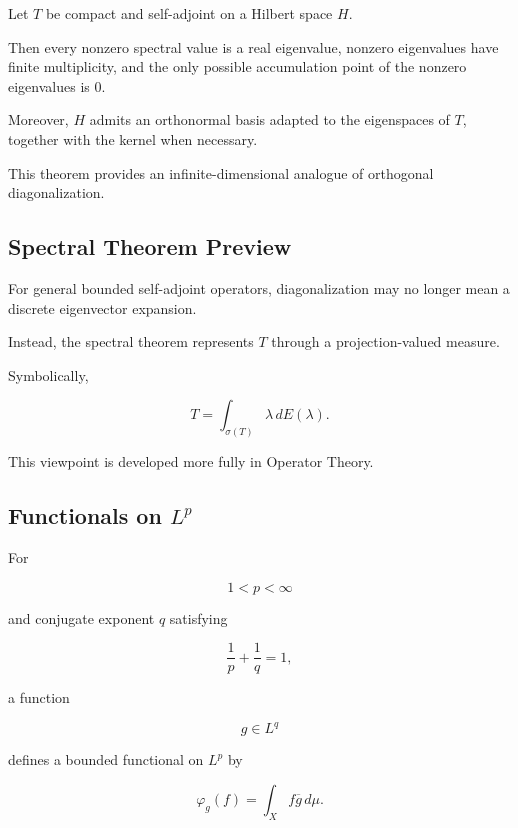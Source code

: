 \begin{theorem}
Let \(T\) be compact and self-adjoint on a Hilbert space \(H\).

Then every nonzero spectral value is a real eigenvalue, nonzero
eigenvalues have finite multiplicity, and the only possible accumulation
point of the nonzero eigenvalues is \(0\).

Moreover, \(H\) admits an orthonormal basis adapted to the eigenspaces of
\(T\), together with the kernel when necessary.
\end{theorem}

This theorem provides an infinite-dimensional analogue of orthogonal
diagonalization.

\subsection{Spectral Theorem Preview}
\label{subsec:spectral-theorem-preview}

For general bounded self-adjoint operators, diagonalization may no longer
mean a discrete eigenvector expansion.

Instead, the spectral theorem represents \(T\) through a projection-valued
measure.

Symbolically,

\[
\boxed{
T
=
\int_{\sigma(T)}
\lambda\,dE(\lambda).
}
\]

This viewpoint is developed more fully in Operator Theory.

\subsection{Functionals on \(L^p\)}
\label{subsec:duality-lp}

For

\[
1<p<\infty
\]

and conjugate exponent \(q\) satisfying

\[
\frac1p+\frac1q=1,
\]

a function

\[
g\in L^q
\]

defines a bounded functional on \(L^p\) by

\[
\boxed{
\varphi_g(f)
=
\int_Xf\overline{g}\,d\mu.
}
\]

